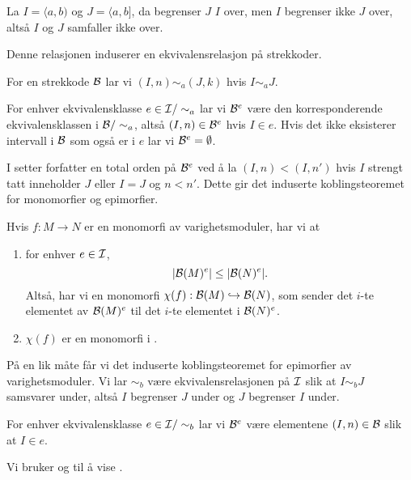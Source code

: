 \begin{bemerk}
  La $I = \langle a,b)$ og $J = \langle a,b]$, da
  begrenser $J$ $I$ over, men $I$ begrenser ikke $J$ over,
  altså $I$ og $J$ samfaller ikke over.
\end{bemerk}

Denne relasjonen induserer en ekvivalensrelasjon på
strekkoder.

\begin{definisjon}\label{def:EkRelBarc}
  For en strekkode $\mathcal{B}$ lar vi $(I,n)\sim_a (J,k)$ hvis
  $I\sim_a J$.
\end{definisjon}

For enhver ekvivalensklasse $e\in\mathcal{I}/\sim_a$ lar vi
$\mathcal{B}^e$ være den korresponderende ekvivalensklassen
i $\mathcal{B}/\sim_a$, altså $(I,n)\in\mathcal{B}^e$ hvis $I\in e$.
Hvis det ikke eksisterer intervall i $\mathcal{B}$ som også er
i $e$ lar vi $\mathcal{B}^e=\emptyset$.

I \citep[seksjon 3.2]{Bauer2020} setter forfatter en total orden
på $\mathcal{B}^e$ ved å la $(I,n) < (I,n')$ hvis $I$ strengt tatt
inneholder $J$ eller $I=J$ og $n<n'$. Dette gir det induserte
koblingsteoremet for monomorfier og epimorfier.

\begin{proposisjon}
Hvis $f:M\to N$ er en monomorfi av varighetsmoduler, har vi at
\begin{enumerate}
  \item for enhver $e\in\mathcal{I}$,
    \[|\mathcal{B}(M)^e|\leq|\mathcal{B}(N)^e|.\]
    Altså, har vi en monomorfi $\chi(f):\mathcal{B}(M)\hookrightarrow\mathcal{B}(N)$,
    som sender det $i$-te elementet av $\mathcal{B}(M)^e$ til det $i$-te
    elementet i $\mathcal{B}(N)^e$.
  \item $\chi(f)$ er en monomorfi i \Barc.
\end{enumerate}
\end{proposisjon}

På en lik måte får vi det induserte koblingsteoremet for
epimorfier av varighetsmoduler. Vi lar $\sim_b$ være
ekvivalensrelasjonen på $\mathcal{I}$ slik at $I\sim_b J$
samsvarer under, altså $I$ begrenser $J$ under og $J$
begrenser $I$ under. 

For enhver ekvivalensklasse
$e\in\mathcal{I}/\sim_b$ lar vi $\mathcal{B}^e$ være elementene
$(I,n)\in\mathcal{B}$ slik at $I\in e$.


Vi bruker \citep[lemma 3.4]{Bauer2020} og \citep[lemma
3.5]{Bauer2020} til å vise
.

